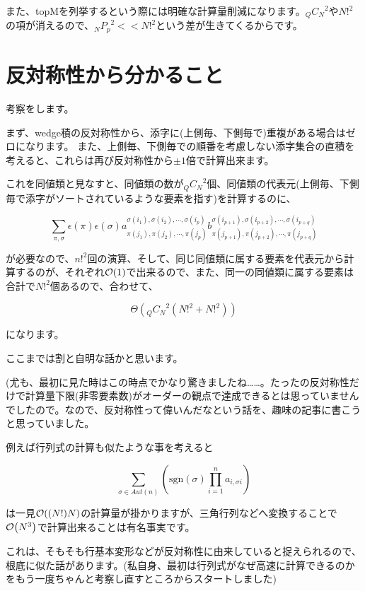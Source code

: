 \documentclass[a4paper, 10pt, dvipdfmx]{jlreq}
\begin{document}
また、topMを列挙するという際には明確な計算量削減になります。${{}_Q C_N}^2$や${N!}^2$の項が消えるので、${{}_N P_p}^2 << {N!}^2$という差が生きてくるからです。

\section{反対称性から分かること}

考察をします。

まず、wedge積の反対称性から、添字に(上側毎、下側毎で)重複がある場合はゼロになります。
また、上側毎、下側毎での順番を考慮しない添字集合の直積を考えると、これらは再び反対称性から$\pm 1$倍で計算出来ます。

これを同値類と見なすと、同値類の数が${{}_Q C_N}^2$個、同値類の代表元(上側毎、下側毎で添字がソートされているような要素を指す)を計算するのに、

$$
    \sum_{\pi, \sigma}\epsilon(\pi)\epsilon(\sigma)a_{\pi(j_{1}), \pi(j_{2}), \cdots, \pi(j_{p}) }^{ \sigma(i_{1}), \sigma(i_{2}), \cdots, \sigma(i_{p})}b_{\pi(j_{p+1}), \pi(j_{p+2}), \cdots, \pi(j_{p+q}) }^{ \sigma(i_{p+1}), \sigma(i_{p+2}), \cdots, \sigma(i_{p+q})}
$$

が必要なので、${n!}^2$回の演算、そして、同じ同値類に属する要素を代表元から計算するのが、それぞれ$\order{1}$で出来るので、また、同一の同値類に属する要素は合計で${N!}^2$個あるので、合わせて、

$$
    \Theta\left({{}_Q C_N}^2\left({N!}^2+{N!}^2\right)\right)
$$

になります。

ここまでは割と自明な話かと思います。

(尤も、最初に見た時はこの時点でかなり驚きましたね……。たったの反対称性だけで計算量下限(非零要素数)がオーダーの観点で達成できるとは思っていませんでしたので。なので、反対称性って偉いんだなという話を、趣味の記事に書こうと思っていました。

例えば行列式の計算も似たような事を考えると

$$
    \sum_{\sigma \in Aut(n)}{\left(\mathrm{sgn}(\sigma)\prod_{i=1}^{n}{a_{i,\sigma{i}}}\right)}
$$

は一見$\order{(N!)N}$の計算量が掛かりますが、三角行列などへ変換することで$\order{N^3}$で計算出来ることは有名事実です。

これは、そもそも行基本変形などが反対称性に由来していると捉えられるので、根底に似た話があります。(私自身、最初は行列式がなぜ高速に計算できるのかをもう一度ちゃんと考察し直すところからスタートしました)
\end{document}
